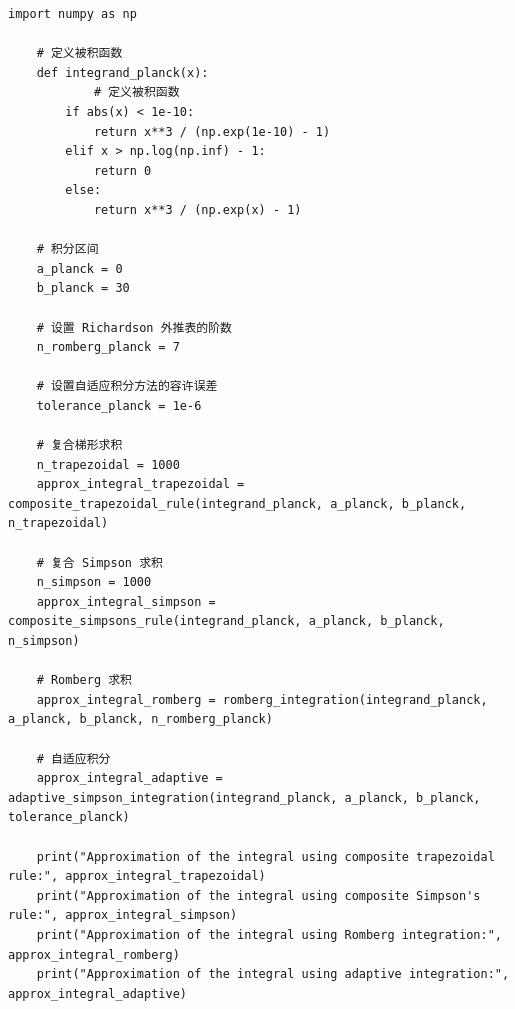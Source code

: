 \documentclass[UTF8,ctexart,a4paper,11pt,openany]{article}
\theoremstyle{definition}
\begin{document}
\begin{lstlisting}[aboveskip=0pt]
    import numpy as np
    
    # 定义被积函数
    def integrand_planck(x):
            # 定义被积函数
        if abs(x) < 1e-10:
            return x**3 / (np.exp(1e-10) - 1)
        elif x > np.log(np.inf) - 1:
            return 0
        else:
            return x**3 / (np.exp(x) - 1)
    
    # 积分区间
    a_planck = 0
    b_planck = 30
    
    # 设置 Richardson 外推表的阶数
    n_romberg_planck = 7
    
    # 设置自适应积分方法的容许误差
    tolerance_planck = 1e-6
    
    # 复合梯形求积
    n_trapezoidal = 1000
    approx_integral_trapezoidal = composite_trapezoidal_rule(integrand_planck, a_planck, b_planck, n_trapezoidal)
    
    # 复合 Simpson 求积
    n_simpson = 1000
    approx_integral_simpson = composite_simpsons_rule(integrand_planck, a_planck, b_planck, n_simpson)
    
    # Romberg 求积
    approx_integral_romberg = romberg_integration(integrand_planck, a_planck, b_planck, n_romberg_planck)
    
    # 自适应积分
    approx_integral_adaptive = adaptive_simpson_integration(integrand_planck, a_planck, b_planck, tolerance_planck)
    
    print("Approximation of the integral using composite trapezoidal rule:", approx_integral_trapezoidal)
    print("Approximation of the integral using composite Simpson's rule:", approx_integral_simpson)
    print("Approximation of the integral using Romberg integration:", approx_integral_romberg)
    print("Approximation of the integral using adaptive integration:", approx_integral_adaptive)
\end{lstlisting}

\clearpage



\end{document}
